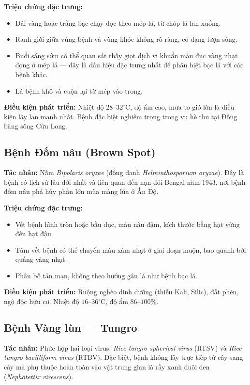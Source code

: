 \textbf{Triệu chứng đặc trưng:}
\begin{itemize}[leftmargin=1.5cm]
    \item Dải vàng hoặc trắng bạc chạy dọc theo mép lá, từ chóp lá lan xuống.
    \item Ranh giới giữa vùng bệnh và vùng khỏe không rõ ràng, có dạng lượn sóng.
    \item Buổi sáng sớm có thể quan sát thấy giọt dịch vi khuẩn màu đục vàng nhạt đọng ở mép lá --- đây là dấu hiệu đặc trưng nhất để phân biệt bạc lá với các bệnh khác.
    \item Lá bệnh khô và cuộn lại từ mép vào trong.
\end{itemize}

\textbf{Điều kiện phát triển:} Nhiệt độ $28$--$32^\circ$C, độ ẩm cao, mưa to gió lớn là điều kiện lây lan mạnh nhất. Bệnh đặc biệt nghiêm trọng trong vụ hè thu tại Đồng bằng sông Cửu Long.

\subsection{Bệnh Đốm nâu (Brown Spot)}
\textbf{Tác nhân:} Nấm \textit{Bipolaris oryzae} (đồng danh \textit{Helminthosporium oryzae}). Đây là bệnh có lịch sử lâu đời nhất và liên quan đến nạn đói Bengal năm 1943, nơi bệnh đốm nâu phá hủy phần lớn mùa màng lúa ở Ấn Độ.

\textbf{Triệu chứng đặc trưng:}
\begin{itemize}[leftmargin=1.5cm]
    \item Vết bệnh hình tròn hoặc bầu dục, màu nâu đậm, kích thước bằng hạt vừng đến hạt đậu.
    \item Tâm vết bệnh có thể chuyển màu xám nhạt ở giai đoạn muộn, bao quanh bởi quầng vàng nhạt.
    \item Phân bố tản mạn, không theo hướng gân lá như bệnh bạc lá.
\end{itemize}

\textbf{Điều kiện phát triển:} Ruộng nghèo dinh dưỡng (thiếu Kali, Silic), đất phèn, ngộ độc hữu cơ. Nhiệt độ $16$--$36^\circ$C, độ ẩm $86$--$100\%$.

\subsection{Bệnh Vàng lùn --- Tungro}
\textbf{Tác nhân:} Phức hợp hai loại virus: \textit{Rice tungro spherical virus} (RTSV) và \textit{Rice tungro bacilliform virus} (RTBV). Đặc biệt, bệnh không lây trực tiếp từ cây sang cây mà phụ thuộc hoàn toàn vào vật trung gian là rầy xanh đuôi đen (\textit{Nephotettix virescens}).


